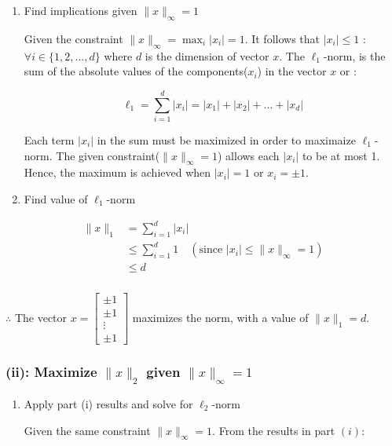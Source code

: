 \documentclass{article}
\begin{document}
\begin{enumerate}
  \item Find implications given $\|x\|_{\infty}=1$

\begin{flushleft}
Given the constraint $\|x\|_{\infty} = \max_{i} |x_i| = 1$. It follows that $|x_i| \le 1$ : $\forall i \in \{1,2,...,d\}$ where $d$ is the dimension of vector $x$.
The $\ell_1$-norm, is the sum of the absolute values of the components($x_i$) in the vector $x$ or :
\end{flushleft}

$$\ell_1 = \sum_{i=1}^d |x_i| = |x_1| + |x_2| + \ldots + |x_d|$$ 
\begin{flushleft}
Each term $|x_i|$ in the sum must be maximized in order to maximaize $\ell_1$-norm. The given constraint($\|x\|_{\infty}=1$) allows each $|x_i|$ to be at most 1. Hence, the maximum is achieved when $|x_i|=1$ or $x_i=\pm1$.
\end{flushleft}
  \item Find value of $\ell_1$-norm
\end{enumerate}
\begin{align*}
    \|x\|_1 &= \sum_{i=1}^d |x_i| \\
    &\le \sum_{i=1}^d 1 \quad (\text{since } |x_i| \le \|x\|_{\infty} = 1) \\
    &\le d
\end{align*}

\subsubsection*{\normalfont}{$\therefore$ The vector $x = \begin{bmatrix} \pm 1 \\ \pm 1 \\ \vdots \\ \pm 1 \end{bmatrix}$ maximizes the norm, with a value of $\|x\|_1 = d$.}

\subsubsection*{(ii): Maximize $\|x\|_2$ given $\|x\|_{\infty}=1$}
\begin{enumerate}
  \item \parbox{\textwidth}{Apply part (i) results and solve for $\ell_2$-norm}
\begin{flushleft}
  Given the same constraint $\|x\|_{\infty} = 1$. From the results in part $(i)$:
\end{flushleft}
\end{enumerate}
\end{document}
